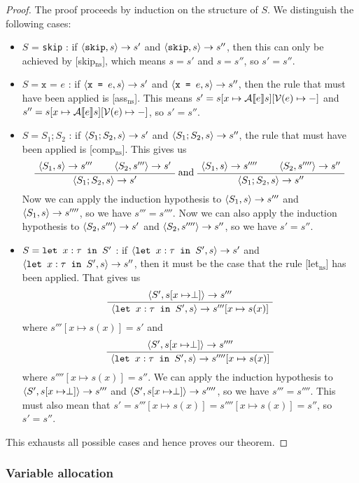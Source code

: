 \begin{proof}
The proof proceeds by induction on the structure of $S$. We distinguish the following cases:
\begin{itemize}[noitemsep]
    \item $S$ = \texttt{skip} : if $\langle \texttt{skip}, s \rangle \to s'$ and $\langle \texttt{skip}, s \rangle \to s''$, then this can only be achieved by [skip$_{\textrm{ns}}$], which means $s=s'$ and $s=s''$, so $s' = s''$. 
    \item $S = \texttt{x = }e$ : if $\langle \texttt{x = }e, s \rangle \to s'$ and $\langle \texttt{x = }e, s \rangle \to s''$, then the rule that must have been applied is [ass$_{\textrm{ns}}$]. This means $s'= s[x \mapsto \mathcal{A} \llbracket e \rrbracket s][\mathcal{V}(e)\mapsto-]$ and $s''=s[x \mapsto \mathcal{A} \llbracket e \rrbracket s][\mathcal{V}(e)\mapsto-]$, so $s'=s''$.
    \item $S = S_1; S_2$ : if $\langle S_1;S_2, s \rangle \to s'$ and $\langle S_1;S_2, s \rangle \to s''$, the rule that must have been applied is [comp$_{\textrm{ns}}$]. This gives us
    $$  \AxiomC{$\ns{S_1}{s}{s'''}$}
\AxiomC{$\ns{S_2}{s'''}{s'}$}
\BinaryInfC{$\ns{S_1; S_2}{s}{s'}$}
\DisplayProof
 \textrm{ and }
 \AxiomC{$\ns{S_1}{s}{s''''}$}
\AxiomC{$\ns{S_2}{s''''}{s''}$}
\BinaryInfC{$\ns{S_1; S_2}{s}{s''}$}
\DisplayProof$$
    Now we can apply the induction hypothesis to $\langle S_1, s \rangle \to s'''$ and $\langle S_1, s \rangle \to s''''$, so we have $s''' = s''''$. Now we can also apply the induction hypothesis to $\langle S_2, s''' \rangle \to s'$ and $\langle S_2, s'''' \rangle \to s''$, so we have $s' = s''$.
    \item $S = \texttt{let }x : \tau \texttt{ in } S'$ : if $\langle \texttt{let }x : \tau \texttt{ in } S', s \rangle \to s'$ and $\langle \texttt{let }x : \tau \texttt{ in } S', s \rangle \to s''$, then it must be the case that the rule [let$_{\textrm{ns}}$] has been applied. That gives us
    $$
    \AxiomC{$\ns{S'}{s[x\mapsto \perp]}{s'''}$}
\UnaryInfC{$\ns{\letm{x}{S'}}{s}{s'''[x \mapsto s(x)]}$}
\DisplayProof
    $$
    where $s'''[x \mapsto s(x)] = s'$ and
    $$\AxiomC{$\ns{S'}{s[x\mapsto \perp]}{s''''}$}
\UnaryInfC{$\ns{\letm{x}{S'}}{s}{s''''[x \mapsto s(x)]}$}
\DisplayProof
    $$
    where $s''''[x \mapsto s(x)] = s''$. 
    We can apply the induction hypothesis to $\langle S', s[x\mapsto \perp] \rangle \to s'''$ and $\langle S', s[x\mapsto \perp] \rangle \to s''''$, so we have $s''' = s''''$. This must also mean that $s' = s'''[x \mapsto s(x)] = s''''[x \mapsto s(x)] = s''$, so $s' = s''$.
\end{itemize}
This exhausts all possible cases and hence proves our theorem. 
\end{proof}

\subsubsection*{Variable allocation}

